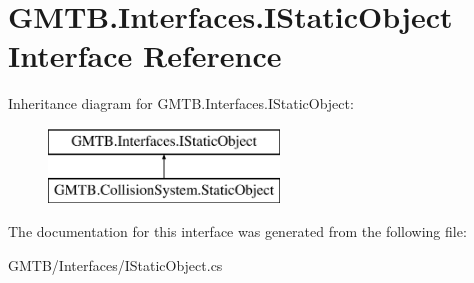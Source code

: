 \hypertarget{interface_g_m_t_b_1_1_interfaces_1_1_i_static_object}{}\section{G\+M\+T\+B.\+Interfaces.\+I\+Static\+Object Interface Reference}
\label{interface_g_m_t_b_1_1_interfaces_1_1_i_static_object}
Inheritance diagram for G\+M\+T\+B.\+Interfaces.\+I\+Static\+Object\+:\begin{figure}[H]
\begin{center}
\leavevmode
\includegraphics[height=2.000000cm]{interface_g_m_t_b_1_1_interfaces_1_1_i_static_object}
\end{center}
\end{figure}


The documentation for this interface was generated from the following file\+:\begin{DoxyCompactItemize}
\item 
G\+M\+T\+B/\+Interfaces/I\+Static\+Object.\+cs\end{DoxyCompactItemize}
